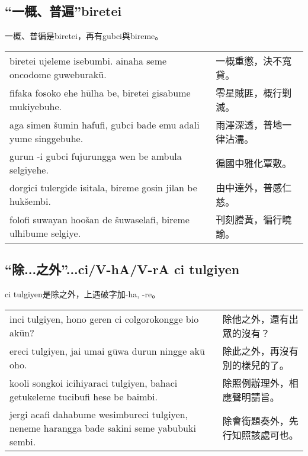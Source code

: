 \documentclass{article}
\begin{document}
\subsection{“一概、普遍”biretei}
\noindent 一概、普徧是biretei，再有gubci與bireme。
\begin{center}
    \begin{tabularx}{\textwidth}{XX}
        biretei ujeleme isebumbi. ainaha seme oncodome guweburak\={u}.& 一概重懲，決不寬貸。\\
        fifaka fosoko ehe h\={u}lha be, biretei gisabume mukiyebuhe. &零星賊匪，概行剿滅。\\
        aga simen \v{s}umin hafufi, gubci bade emu adali yume singgebuhe. & 雨澤深透，普地一律沾濡。\\
        gurun -i gubci fujurungga wen be ambula selgiyehe. & 徧國中雅化覃敷。\\
        dorgici tulergide isitala, bireme gosin jilan be huk\v{s}embi. & 由中達外，普感仁慈。\\
        folofi suwayan hoo\v{s}an de \v{s}uwaselafi, bireme ulhibume selgiye. & 刊刻謄黃，徧行曉諭。
    \end{tabularx}
\end{center}

\subsection{“除...之外”...ci/V-hA/V-rA ci tulgiyen}
\noindent ci tulgiyen是除之外，上遇破字加-ha, -re。
\begin{center}
    \begin{tabularx}{\textwidth}{XX}
        inci tulgiyen, hono geren ci colgorokongge bio ak\={u}n? & 除他之外，還有出眾的沒有？\\
        ereci tulgiyen, jai umai g\={u}wa durun ningge ak\={u} oho. & 除此之外，再沒有別的樣兒的了。\\
        kooli songkoi icihiyaraci tulgiyen, bahaci getukeleme tucibufi hese be baimbi. & 除照例辦理外，相應聲明請旨。\\
        jergi acafi dahabume wesimbureci tulgiyen, neneme harangga bade sakini seme yabubuki sembi. & 除會銜題奏外，先行知照該處可也。
    \end{tabularx}
\end{center}
\end{document}
